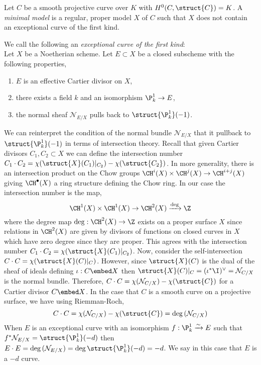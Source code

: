 \renewcommand{\N}{\mathcal{N}}

\begin{definition}
Let $C$ be a smooth projective curve over $K$ with $H^0(C, \struct{C}) = K$. A \textit{minimal model} is a regular, proper model $X$ of $C$ such that $X$ does not contain an exceptional curve of the first kind. 
\end{definition}

\begin{definition}
We call the following an \textit{exceptional curve of the first kind}:
\bigskip\\
Let $X$ be a Noetherian scheme. Let $E \subset X$ be a closed subscheme with the following properties,
\begin{enumerate}
\item $E$ is an effective Cartier divisor on $X$,
\item there exists a field $k$ and an isomorphism $\P^1_k \to E$,
\item the normal sheaf $\mathcal{N}_{E/X}$ pulls back to $\struct{\P^1_k}(-1)$. 
\end{enumerate}
\end{definition}

\begin{rmk}
We can reinterpret the condition of the normal bundle $\N_{E/X}$ that it pullback to $\struct{\P^1_k}(-1)$ in terms of intersection theory. Recall that given Cartier divisors $C_1, C_2 \subset X$ we can define the intersection number $C_1 \cdot C_2 = \chi(\struct{X}(C_1)|_{C_2}) - \chi(\struct{C_2})$. In more generality, there is an intersection product on the Chow groups $\CH^i(X) \times \CH^j(X) \to \CH^{i+j}(X)$ giving $\CH^\bullet(X)$ a ring structure defining the Chow ring. In our case the intersection number is the map,
\[ \CH^1(X) \times \CH^1(X) \to \CH^2(X) \xrightarrow{\deg} \Z \]
where the degree map $\deg : \CH^2(X) \to \Z$ exists on a proper surface $X$ since relations in $\CH^2(X)$ are given by divisors of functions on closed curves in $X$ which have zero degree since they are proper. This agrees with the intersection number $C_1 \cdot C_2 = \chi(\struct{X}(C_1)|_{C_2})$. Now, consider the self-intersection $C \cdot C = \chi(\struct{X}(C)|_C)$. However, since $\struct{X}(C)$ is the dual of the sheaf of ideals defining $\iota : C \embed X$ then $\struct{X}(C)|_C = (\iota^* \I)^\vee = \N_{C/X}$ is the normal bundle. Therefore, $C \cdot C = \chi(\N_{C/X}) - \chi(\struct{C})$ for a Cartier divisor $C \embed X$. In the case that $C$ is a smooth curve on a projective surface, we have using Riemman-Roch,
\[ C \cdot C = \chi(\N_{C/X}) - \chi(\struct{C}) = \deg{(\N_{C/X})} \]
When $E$ is an exceptional curve with an isomorphism $f : \P^1_k \xrightarrow{\sim} E$ such that $f^* \N_{E/X} = \struct{\P^1_k}(-d)$ then $E \cdot E = \deg{(\N_{E/X})} = \deg{\struct{\P^1_k}(-d)} = -d$. We say in this case that $E$ is a $-d$ curve. 
\end{rmk}

